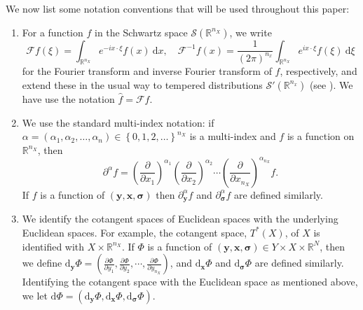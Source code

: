 \documentclass[a4paper,12pt]{amsart}
\numberwithin{equation}{section}
\theoremstyle{plain}
\numberwithin{theorem}{section}
\theoremstyle{definition}
\theoremstyle{remark}
\theoremstyle{remark}
\theoremstyle{remark}
\newcommand{\smo}{\setminus \mathbf{0}}
\newcommand{\paren}[1]{\left(#1\right)}               %
\newcommand{\sparen}[1]{\left\{#1\right\}}      %
\renewcommand{\d}{\,\mathrm{d}}  %
\newcommand{\dd}{\mathrm{d}}  %
\newcommand{\Fc}{\mathcal{F}}
\newcommand{\Sc}{\mathcal{S}}
\newcommand{\inv}{^{-1}}
\newcommand{\partyf}[2]{\frac{\partial #2}{\partial y_{#1}}}
\newcommand{\vx}{{\mathbf{x}}}
\newcommand{\vy}{{\mathbf{y}}}
\newcommand{\vz}{{\mathbf{z}}}
\newcommand{\vsig}{{\boldsymbol{\sigma}}} %
\newcommand{\rr}{{{\mathbb R}}}
\begin{document}
We now list some notation conventions that will be used throughout this paper:
\begin{enumerate}
\item For a function $f$ in the Schwartz space $\Sc(\mathbb{R}^{n_X})$, we {write
\[
\mathcal{F}f(\xi) = \int_{\mathbb{R}^{n_X}} e^{-i x\cdot \xi}f(x)\ \dd x,\quad \mathcal{F}^{-1}f(x) = \frac{1}{(2 \pi)^{n_x}}\int_{\mathbb{R}^{n_X}} e^{i x\cdot \xi}f(\xi)\ \dd \xi
\]
for} the Fourier transform and inverse Fourier transform of $f$,
respectively, {and extend these in the usual way to tempered distributions $\Sc'(\mathbb{R}^{n_x})$} (see \cite[Definition 7.1.1]{hormanderI}). We have use the notation $\hat{f} = \mathcal{F}f$. %

\item We use the standard multi-index notation: if
$\alpha=(\alpha_1,\alpha_2,\dots,\alpha_n)\in \sparen{0,1,2,\dots}^{n_X}$
is a multi-index and $f$ is a function on $\mathbb{R}^{n_X}$, then
\[\partial^\alpha f=\paren{\frac{\partial}{\partial
x_1}}^{\alpha_1}\paren{\frac{\partial}{\partial
x_2}}^{\alpha_2}\cdots\paren{\frac{\partial}{\partial x_{n_X}}}^{\alpha_{n_X}}
f.\] If $f$ is a function of $(\vy,\vx,\vsig)$ then $\partial^\alpha_\vy
f$ and $\partial^\alpha_\vsig f$ are defined similarly.



\item \label{item:T*Xident} We identify the cotangent
spaces of Euclidean spaces with the underlying Euclidean spaces. For example, the cotangent space, 
$T^*(X)$, of $X$ is identified with $X\times \mathbb{R}^{n_X}$. If $\Phi$ is a function of $(\vy,\vx,\vsig)\in Y\times X\times \rr^N$,
then we define $\dd_{\vy} \Phi = \paren{\partyf{1}{\Phi},
\partyf{2}{\Phi}, \cdots, \partyf{{n_X}}{\Phi} }$, and $\dd_\vx\Phi$ and $
\dd_{\vsig} \Phi $ are defined similarly. Identifying the cotangent space with the Euclidean space as mentioned above, we let $\dd\Phi =
\paren{\dd_{\vy} \Phi, \dd_{\vx} \Phi,\dd_{\vsig} \Phi}$.



\end{enumerate}
\end{document}
